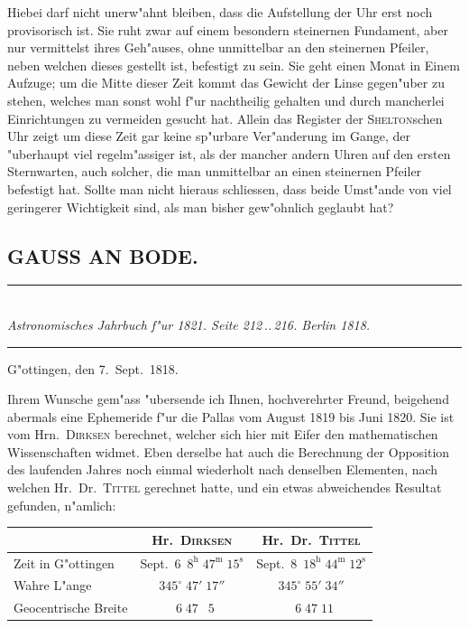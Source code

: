 \documentclass[12pt,a4paper]{article}
\begin{document}
Hiebei darf nicht unerw"ahnt bleiben, dass die Aufstellung der Uhr erst noch provisorisch ist.
Sie ruht zwar auf einem besondern steinernen Fundament, aber nur vermittelst ihres Geh"auses, ohne
unmittelbar an den steinernen Pfeiler, neben welchen dieses gestellt ist, befestigt zu sein. Sie geht einen
Monat in Einem Aufzuge; um die Mitte dieser Zeit kommt das Gewicht der Linse gegen"uber zu stehen,
welches man sonst wohl f"ur nachtheilig gehalten und durch mancherlei Einrichtungen zu vermeiden
gesucht hat. Allein das Register der \textsc{Shelton}schen Uhr zeigt um diese Zeit gar keine sp"urbare Ver"anderung
im Gange, der "uberhaupt viel regelm"assiger ist, als der mancher andern Uhren auf den ersten Sternwarten,
auch solcher, die man unmittelbar an einen steinernen Pfeiler befestigt hat. Sollte man nicht hieraus
schliessen, dass beide Umst"ande von viel geringerer Wichtigkeit sind, als man bisher gew"ohnlich geglaubt hat?

\newpage

\subsection*{GAUSS AN BODE.}

\begin{center}
\rule{0.6\textwidth}{0.4pt}\\[0.5em]
\textit{Astronomisches Jahrbuch f"ur 1821. Seite 212\,..\,216. Berlin 1818.}\\[0.3em]
\rule{0.6\textwidth}{0.4pt}
\end{center}

\begin{flushright}
G"ottingen, den 7.~Sept.~1818.
\end{flushright}

Ihrem Wunsche gem"ass "ubersende ich Ihnen, hochverehrter Freund, beigehend abermals eine
Ephemeride f"ur die Pallas vom August 1819 bis Juni 1820. Sie ist vom Hrn.~\textsc{Dirksen} berechnet, welcher
sich hier mit Eifer den mathematischen Wissenschaften widmet. Eben derselbe hat auch die Berechnung
der Opposition des laufenden Jahres noch einmal wiederholt nach denselben Elementen, nach welchen
Hr.~Dr.~\textsc{Tittel} gerechnet hatte, und ein etwas abweichendes Resultat gefunden, n"amlich:

\begin{center}
\begin{tabular}{l|c|c}
& Hr.~\textsc{Dirksen} & Hr.~Dr.~\textsc{Tittel} \\
\midrule
Zeit in G"ottingen & Sept.~6\ $8^{\mathrm{h}}\;47^{\mathrm{m}}\;15^{\mathrm{s}}$ & Sept.~8\ $18^{\mathrm{h}}\;44^{\mathrm{m}}\;12^{\mathrm{s}}$ \\
Wahre L"ange & $345^{\circ}\;47'\;17''$ & $345^{\circ}\;55'\;34''$ \\
Geocentrische Breite & $\phantom{0}6\;47\;\phantom{0}5$ & $\phantom{0}6\;47\;11$ \\
\end{tabular}
\end{center}
\end{document}
